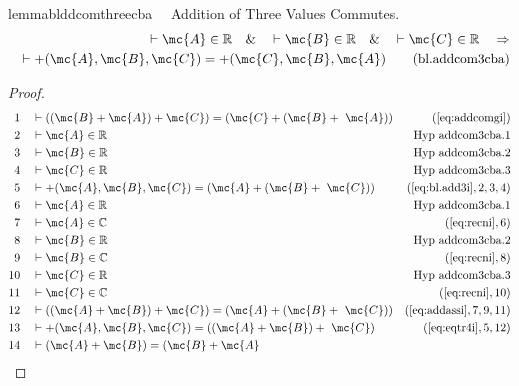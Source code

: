 \begin{restatable}{lemma}{blddcomthreecba}~~ Addition of Three Values Commutes.
\begin{align}
\vdash \mc{A} \in \mathbb{R}\quad\&\quad \vdash \mc{B} \in
    \mathbb{R}\quad\&\quad \vdash \mc{C} \in \mathbb{R}\quad\Rightarrow \notag \\ 
	\quad
    \vdash +( \mc{A} , \mc{B} , \mc{C} ) = +( \mc{C} , \mc{B} , \mc{A}
    )\label{eq:bl.addcom3cba}\tag{bl.addcom3cba}
\end{align}
\end{restatable}

\begin{proof}
\begin{align}
  1 &&  & \vdash ( ( \mc{B} + \mc{A} ) + \mc{C} ) = ( \mc{C} + ( \mc{B} +
     ~\mc{A} ) )&(\mbox{\ref{eq:addcomgi}})\notag
  \\ 2 &&  & \vdash \mc{A} \in
\mathbb{R}&\text{Hyp~addcom3cba.1}\notag%
  \\ 3 &&  & \vdash \mc{B} \in
\mathbb{R}&\text{Hyp~addcom3cba.2}\notag%
  \\ 4 &&  & \vdash \mc{C} \in
\mathbb{R}&\text{Hyp~addcom3cba.3}\notag%
  \\ 5 &&  & \vdash +( \mc{A} , \mc{B} , \mc{C} ) = ( \mc{A} + ( \mc{B} +
     ~\mc{C} ) )&(\mbox{\ref{eq:bl.add3i}},2,3,4)\notag
  \\ 6 &&  & \vdash \mc{A} \in
\mathbb{R}&\text{Hyp~addcom3cba.1}\notag%
  \\ 7 &&  & \vdash \mc{A} \in \mathbb{C}&(\mbox{\ref{eq:recni}},6)\notag
  \\ 8 &&  & \vdash \mc{B} \in
\mathbb{R}&\text{Hyp~addcom3cba.2}\notag%
  \\ 9 &&  & \vdash \mc{B} \in \mathbb{C}&(\mbox{\ref{eq:recni}},8)\notag
  \\ 10 &&  & \vdash \mc{C} \in
\mathbb{R}&\text{Hyp~addcom3cba.3}\notag%
  \\ 11 &&  & \vdash \mc{C} \in \mathbb{C}&(\mbox{\ref{eq:recni}},10)\notag
  \\ 12 &&  & \vdash ( ( \mc{A} + \mc{B} ) + \mc{C} ) = ( \mc{A} + ( \mc{B} +
     ~\mc{C} ) )&(\mbox{\ref{eq:addassi}},7,9,11)\notag
  \\ 13 &&  & \vdash +( \mc{A} , \mc{B} , \mc{C} ) = ( ( \mc{A} + \mc{B} ) +
     ~\mc{C} )&(\mbox{\ref{eq:eqtr4i}},5,12)\notag
  \\ 14 &&  & \vdash ( \mc{A} + \mc{B} ) = ( \mc{B} + \mc{A}

\end{align}
\end{proof}

